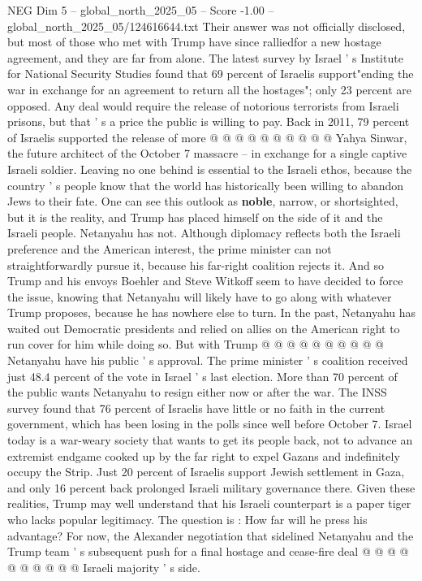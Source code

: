 \begin{textsample}{NEG Dim 5 – global\_north\_2025\_05 – Score -1.00 – global\_north\_2025\_05/124616644.txt}
Their answer was not officially disclosed, but most of those who met with Trump have since ralliedfor a new hostage agreement, and they are far from alone.
The latest survey by Israel ' s Institute for National Security Studies found that 69 percent of Israelis support"ending the war in exchange for an agreement to return all the hostages"; only 23 percent are opposed.
Any deal would require the release of notorious terrorists from Israeli prisons, but that ' s a price the public is willing to pay.
Back in 2011, 79 percent of Israelis supported the release of more @ @ @ @ @ @ @ @ @ @ Yahya Sinwar, the future architect of the October 7 massacre -- in exchange for a single captive Israeli soldier.
Leaving no one behind is essential to the Israeli ethos, because the country ' s people know that the world has historically been willing to abandon Jews to their fate.
One can see this outlook as \textbf{noble}, narrow, or shortsighted, but it is the reality, and Trump has placed himself on the side of it and the Israeli people.
Netanyahu has not.
Although diplomacy reflects both the Israeli preference and the American interest, the prime minister can not straightforwardly pursue it, because his far-right coalition rejects it.
And so Trump and his envoys Boehler and Steve Witkoff seem to have decided to force the issue, knowing that Netanyahu will likely have to go along with whatever Trump proposes, because he has nowhere else to turn.
In the past, Netanyahu has waited out Democratic presidents and relied on allies on the American right to run cover for him while doing so.
But with Trump @ @ @ @ @ @ @ @ @ @ Netanyahu have his public ' s approval.
The prime minister ' s coalition received just 48.4 percent of the vote in Israel ' s last election.
More than 70 percent of the public wants Netanyahu to resign either now or after the war.
The INSS survey found that 76 percent of Israelis have little or no faith in the current government, which has been losing in the polls since well before October 7.
Israel today is a war-weary society that wants to get its people back, not to advance an extremist endgame cooked up by the far right to expel Gazans and indefinitely occupy the Strip.
Just 20 percent of Israelis support Jewish settlement in Gaza, and only 16 percent back prolonged Israeli military governance there.
Given these realities, Trump may well understand that his Israeli counterpart is a paper tiger who lacks popular legitimacy.
The question is : How far will he press his advantage?
For now, the Alexander negotiation that sidelined Netanyahu and the Trump team ' s subsequent push for a final hostage and cease-fire deal @ @ @ @ @ @ @ @ @ @ Israeli majority ' s side.

\end{textsample}

